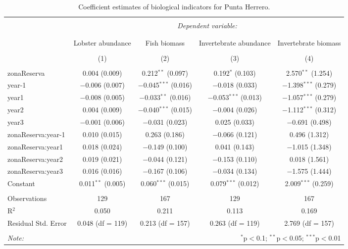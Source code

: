 
\begin{table}[!htbp] \centering 
  \caption{Coefficient estimates of biological indicators for Punta Herrero.} 
  \label{} 
\small 
\begin{tabular}{@{\extracolsep{1pt}}lcccc} 
\\[-1.8ex]\hline 
\hline \\[-1.8ex] 
 & \multicolumn{4}{c}{\textit{Dependent variable:}} \\ 
\cline{2-5} 
\\[-1.8ex] & \multicolumn{4}{c}{} \\ 
 & Lobster abundance & Fish biomass & Invertebrate abundance & Invertebrate biomass \\ 
\\[-1.8ex] & (1) & (2) & (3) & (4)\\ 
\hline \\[-1.8ex] 
 zonaReserva & 0.004 (0.009) & 0.212$^{**}$ (0.097) & 0.192$^{*}$ (0.103) & 2.570$^{**}$ (1.254) \\ 
  year-1 & $-$0.006 (0.007) & $-$0.045$^{***}$ (0.016) & $-$0.018 (0.033) & $-$1.398$^{***}$ (0.279) \\ 
  year1 & $-$0.008 (0.005) & $-$0.033$^{**}$ (0.016) & $-$0.053$^{***}$ (0.013) & $-$1.057$^{***}$ (0.279) \\ 
  year2 & 0.004 (0.009) & $-$0.040$^{***}$ (0.015) & $-$0.004 (0.026) & $-$1.112$^{***}$ (0.312) \\ 
  year3 & $-$0.001 (0.006) & $-$0.031 (0.023) & 0.025 (0.033) & $-$0.691 (0.498) \\ 
  zonaReserva:year-1 & 0.010 (0.015) & 0.263 (0.186) & $-$0.066 (0.121) & 0.496 (1.312) \\ 
  zonaReserva:year1 & 0.018 (0.024) & $-$0.149 (0.100) & 0.041 (0.143) & $-$1.015 (1.348) \\ 
  zonaReserva:year2 & 0.019 (0.021) & $-$0.044 (0.121) & $-$0.153 (0.110) & 0.018 (1.561) \\ 
  zonaReserva:year3 & 0.016 (0.016) & $-$0.167 (0.106) & $-$0.034 (0.134) & $-$1.575 (1.444) \\ 
  Constant & 0.011$^{**}$ (0.005) & 0.060$^{***}$ (0.015) & 0.079$^{***}$ (0.012) & 2.009$^{***}$ (0.259) \\ 
 \hline \\[-1.8ex] 
Observations & 129 & 167 & 129 & 167 \\ 
R$^{2}$ & 0.050 & 0.211 & 0.113 & 0.169 \\ 
Residual Std. Error & 0.048 (df = 119) & 0.213 (df = 157) & 0.263 (df = 119) & 2.769 (df = 157) \\ 
\hline 
\hline \\[-1.8ex] 
\textit{Note:}  & \multicolumn{4}{r}{$^{*}$p$<$0.1; $^{**}$p$<$0.05; $^{***}$p$<$0.01} \\ 
\end{tabular} 
\end{table} 
